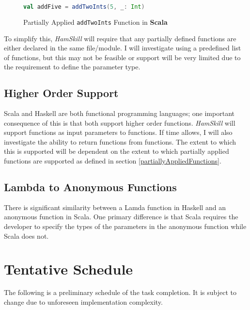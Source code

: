\documentclass{report}
\begin{document}
\begin{figure}[H]
\begin{mdframed}
\begin{lstlisting}[language=Scala]
val addFive = addTwoInts(5, _: Int)
\end{lstlisting}
\end{mdframed}
\caption{Partially Applied {\tt addTwoInts} Function in \textbf{Scala}}\label{fig:addFiveScala}
\end{figure}

To simplify this, \emph{HamSkill} will require that any partially defined functions are either declared in the same file/module.  I will investigate using a predefined list of functions, but this may not be feasible or support will be very limited due to the requirement to define the parameter type.

\subsection{Higher Order Support}

Scala and Haskell are both functional programming languages; one important consequence of this is that both support higher order functions.  \emph{HamSkill} will support functions as input parameters to functions.  If time allows, I will also investigate the ability to return functions from functions.  The extent to which this is supported will be dependent on the extent to which partially applied functions are supported as defined in section \ref{partiallyAppliedFunctions}.

\subsection{Lambda to Anonymous Functions}

There is significant similarity between a Lamda function in Haskell and an anonymous function in Scala.  One primary difference is that Scala requires the developer to specify the types of the parameters in the anonymous function while Scala does not.  

\section{Tentative Schedule}

The following is a preliminary schedule of the task completion.  It is subject to change due to unforeseen implementation complexity.
\end{document}
